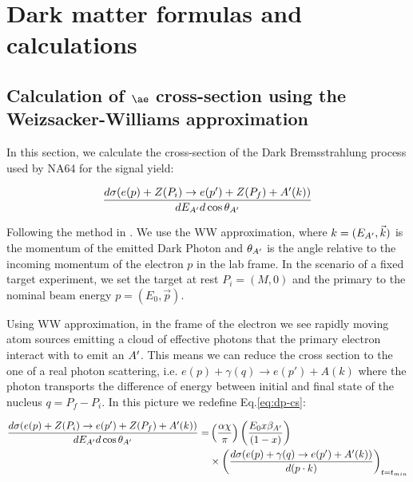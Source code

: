 
\newcommand{\appdira}{appendices/plots/appendixA}

\chapter{Dark matter formulas and calculations} %

\label{AppendixA} %


\section{Calculation of $\ae$ cross-section using the Weizsacker-Williams approximation}
\label{appA:sec:cross-section-wz}

In this section, we calculate the cross-section of the Dark Bremsstrahlung process used by NA64 for the signal yield:

\begin{equation}
  \label{eq:dp-cs}
  \frac{d\sigma(e(p) + Z(P_i) \to e(p') + Z(P_f) + A'(k))}{dE_{A'}d\cos{\theta_{A'}}}
\end{equation}

Following the method in \cite{jdb}. We use the WW approximation, where $k=(E_{A'},\vec{k})$ is the momentum of the emitted Dark Photon and $\theta_{A'}$ is the angle relative to the incoming momentum of the electron $p$ in the lab frame. In the scenario of a fixed target experiment, we set the target at rest $P_i = (M,0)$ and the primary to the nominal beam energy $p = (E_0, \vec{p})$.

Using WW approximation, in the frame of the electron we see rapidly moving atom sources emitting a cloud of effective photons that the primary electron interact with to emit an $A'$. This means we can reduce the cross section to the one of a real photon scattering, i.e. $e(p) + \gamma(q) \to e(p') + A(k)$ where the photon transports the difference of energy between initial and final state of the nucleus $q = P_f - P_i$. In this picture we redefine Eq.\ref{eq:dp-cs}:

\begin{equation}
  \label{eq:dp-cs-ww}
  \begin{aligned}
    \frac{d\sigma(e(p) + Z(P_i) \to e(p') + Z(P_f) + A'(k))}{dE_{A'}d\cos{\theta_{A'}}} = &\left(\frac{\alpha \chi}{\pi} \right) \left(\frac{E_0 x \beta_{A'}}{(1 - x)} \right) \\
    &\times \left( \frac{d\sigma(e(p) + \gamma(q) \to e(p') + A'(k))}{d(p \cdot k)} \right)_{t = t_{min}}
   \end{aligned}
 \end{equation}

